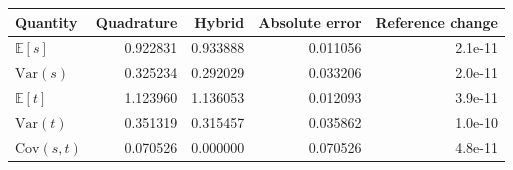 \begin{tabular}{lrrrr}
\toprule
Quantity & Quadrature & Hybrid & Absolute error & Reference change \\
\midrule
$\mathbb E[s]$ & 0.922831 & 0.933888 & 0.011056 & 2.1e-11 \\
$\mathrm{Var}(s)$ & 0.325234 & 0.292029 & 0.033206 & 2.0e-11 \\
$\mathbb E[t]$ & 1.123960 & 1.136053 & 0.012093 & 3.9e-11 \\
$\mathrm{Var}(t)$ & 0.351319 & 0.315457 & 0.035862 & 1.0e-10 \\
$\mathrm{Cov}(s,t)$ & 0.070526 & 0.000000 & 0.070526 & 4.8e-11 \\
\bottomrule
\end{tabular}
